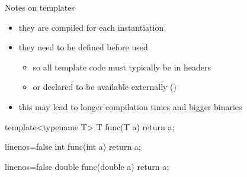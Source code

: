 \begin{frame}[fragile]
  \begin{block}{Notes on templates}
    \begin{itemize}
      \item they are compiled for each instantiation
      \item they need to be defined before used
      \begin{itemize}
        \item so all template code must typically be in headers
        \item or declared to be available externally ()
      \end{itemize}
      \item this may lead to longer compilation times and bigger binaries
    \end{itemize}
  \end{block}
  \newsavebox{\codepiece}
  \begin{lrbox}{\codepiece}
    \begin{minipage}{.35\linewidth}
      \small
      \begin{cppcode*}{}
        template<typename T>
        T func(T a) {
          return a;
        }
      \end{cppcode*}
    \end{minipage}
  \end{lrbox}
  \newsavebox{\codepiecea}
  \begin{lrbox}{\codepiecea}
    \begin{minipage}{.4\linewidth}
      \small
      \begin{cppcode*}{linenos=false}
        int func(int a) {
          return a;
        }
      \end{cppcode*}
    \end{minipage}
  \end{lrbox}
  \newsavebox{\codepieceb}
  \begin{lrbox}{\codepieceb}
    \begin{minipage}{.4\linewidth}
      \small
      \begin{cppcode*}{linenos=false}
        double func(double a) {
          return a;
        }
      \end{cppcode*}
    \end{minipage}
  \end{lrbox}
\end{frame}


